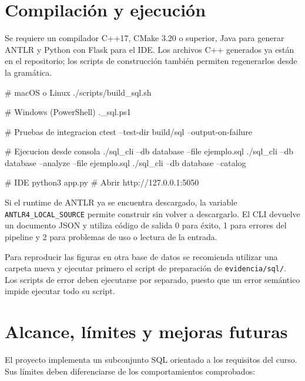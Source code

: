\documentclass[11pt,a4paper]{article}
\begin{document}
\section{Compilación y ejecución}

Se requiere un compilador C++17, CMake 3.20 o superior, Java para generar
ANTLR y Python con Flask para el IDE. Los archivos C++ generados ya están
en el repositorio; los scripts de construcción también permiten
regenerarlos desde la gramática.

\begin{archivo}
# macOS o Linux
./scripts/build_sql.sh

# Windows (PowerShell)
.\scripts\build_sql.ps1

# Pruebas de integracion
ctest --test-dir build/sql --output-on-failure

# Ejecucion desde consola
./sql_cli --db database --file ejemplo.sql
./sql_cli --db database --analyze --file ejemplo.sql
./sql_cli --db database --catalog

# IDE
python3 app.py
# Abrir http://127.0.0.1:5050
\end{archivo}

Si el runtime de ANTLR ya se encuentra descargado, la variable
\texttt{ANTLR4\_LOCAL\_SOURCE} permite construir sin volver a descargarlo.
El CLI devuelve un documento JSON y utiliza código de salida 0 para
éxito, 1 para errores del pipeline y 2 para problemas de uso o lectura
de la entrada.

Para reproducir las figuras en otra base de datos se recomienda utilizar
una carpeta nueva y ejecutar primero el script de preparación de
\texttt{evidencia/sql/}. Los scripts de error deben ejecutarse por
separado, puesto que un error semántico impide ejecutar todo su script.

\section{Alcance, límites y mejoras futuras}

El proyecto implementa un subconjunto SQL orientado a los requisitos del
curso. Sus límites deben diferenciarse de los comportamientos comprobados:
\end{document}
